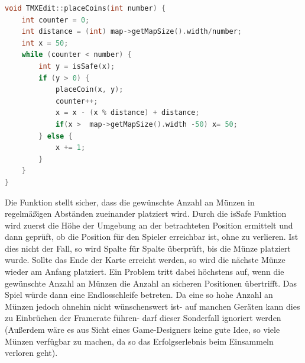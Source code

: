 \begin{lstlisting}[label=lst:place_coins,
				   language=C++,
				   firstnumber=171,
				   caption=Automatisches Platzieren von Münzen( TMXEdit.cpp )]
void TMXEdit::placeCoins(int number) {
	int counter = 0;
	int distance = (int) map->getMapSize().width/number;
	int x = 50;
	while (counter < number) {
		int y = isSafe(x);
		if (y > 0) {
			placeCoin(x, y);
			counter++;
			x = x - (x % distance) + distance;
			if(x >  map->getMapSize().width -50) x= 50;
		} else {
			x += 1;
		}
	}
}
\end{lstlisting}
Die Funktion stellt sicher, dass die gewünschte Anzahl an Münzen in regelmäßigen Abständen zueinander platziert wird. Durch die isSafe Funktion wird zuerst die Höhe der Umgebung an der betrachteten Position ermittelt und dann geprüft, ob die Position für den Spieler erreichbar ist, ohne zu verlieren. Ist dies nicht der Fall, so wird Spalte für Spalte überprüft, bis die Münze platziert wurde. Sollte das Ende der Karte erreicht werden, so wird die nächste Münze wieder am Anfang platziert. Ein Problem tritt dabei höchstens auf, wenn die gewünschte Anzahl an Münzen die Anzahl an sicheren Positionen übertrifft. Das Spiel würde dann eine Endlosschleife betreten.  Da eine so hohe Anzahl an Münzen jedoch ohnehin nicht wünschenswert ist- auf manchen Geräten kann dies zu Einbrüchen der Framerate führen- darf dieser Sonderfall ignoriert werden (Außerdem wäre es aus Sicht eines Game-Designers keine gute Idee, so viele Münzen verfügbar zu machen, da so das Erfolgserlebnis beim Einsammeln verloren geht).

